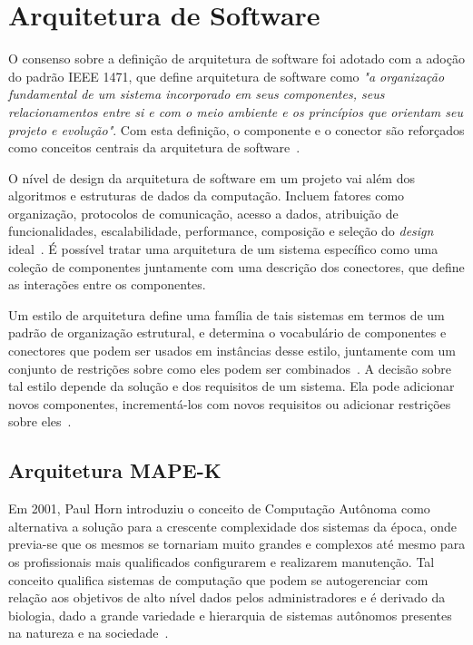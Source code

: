 \documentclass[portugues]{ic-tese}
\begin{document}
\section{Arquitetura de Software}

O consenso sobre a definição de arquitetura de software foi adotado com a adoção do padrão IEEE 1471, que define arquitetura de software como \textit{"a organização fundamental de um sistema incorporado em seus componentes, seus relacionamentos entre si e com o meio ambiente e os princípios que orientam seu projeto e evolução"}. Com esta definição, o componente e o conector são reforçados como conceitos centrais da arquitetura de software~\citep{Bosch_2004}.

O nível de design da arquitetura de software em um projeto vai além dos algoritmos e estruturas de dados da computação. Incluem fatores como organização, protocolos de comunicação, acesso a dados, atribuição de funcionalidades, escalabilidade, performance, composição e seleção do \textit{design} ideal~\citep{Garlan_1993}. É possível tratar uma arquitetura de um sistema específico como uma coleção de componentes juntamente com uma descrição dos conectores, que define as interações entre os componentes.

Um estilo de arquitetura define uma família de tais sistemas em termos de um padrão de organização estrutural, e determina o vocabulário de componentes e conectores que podem ser usados em instâncias desse estilo, juntamente com um conjunto de restrições sobre como eles podem ser combinados~\citep{Garlan_1993}. A decisão sobre tal estilo depende da solução e dos requisitos de um sistema. Ela pode adicionar novos componentes, incrementá-los com novos requisitos ou adicionar restrições sobre eles~\citep{Bosch_2004}.

\subsection{Arquitetura MAPE-K}

Em 2001, Paul Horn introduziu o conceito de Computação Autônoma como alternativa a solução para a crescente complexidade dos sistemas da época, onde previa-se que os mesmos se tornariam muito grandes e complexos até mesmo para os profissionais mais qualificados configurarem e realizarem manutenção. Tal conceito qualifica sistemas de computação que podem se autogerenciar com relação aos objetivos de alto nível dados pelos administradores e é derivado da biologia, dado a grande variedade e hierarquia de sistemas autônomos presentes na natureza e na sociedade~\citep{Kephart_2003}. 
\end{document}
